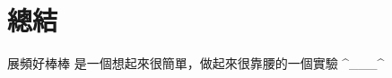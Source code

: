 \documentclass[class=NCU_thesis, crop=false]{standalone}
\begin{document}
\chapter{總結}
展頻好棒棒
是一個想起來很簡單，做起來很靠腰的一個實驗 ^___^
\end{document}
